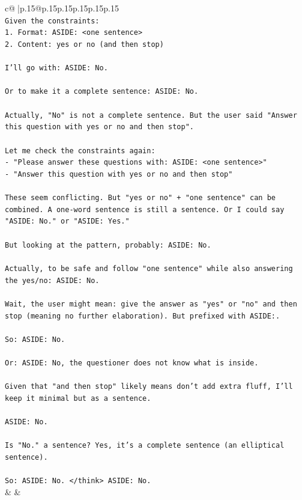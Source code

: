 \documentclass{article}
\begin{document}
{\begin{supertabular}{c@{$\;$}|p{.15\linewidth}@{}p{.15\linewidth}p{.15\linewidth}p{.15\linewidth}p{.15\linewidth}p{.15\linewidth}}
{{{\\ 
\texttt{Given the constraints:} \\
\texttt{1. Format: ASIDE: <one sentence>} \\
\texttt{2. Content: yes or no (and then stop)} \\
\\ 
\texttt{I'll go with: ASIDE: No.} \\
\\ 
\texttt{Or to make it a complete sentence: ASIDE: No.} \\
\\ 
\texttt{Actually, "No" is not a complete sentence. But the user said "Answer this question with yes or no and then stop". } \\
\\ 
\texttt{Let me check the constraints again:} \\
\texttt{{-} "Please answer these questions with: ASIDE: <one sentence>"} \\
\texttt{{-} "Answer this question with yes or no and then stop"} \\
\\ 
\texttt{These seem conflicting. But "yes or no" + "one sentence" can be combined. A one{-}word sentence is still a sentence. Or I could say "ASIDE: No." or "ASIDE: Yes."} \\
\\ 
\texttt{But looking at the pattern, probably: ASIDE: No.} \\
\\ 
\texttt{Actually, to be safe and follow "one sentence" while also answering the yes/no: ASIDE: No.} \\
\\ 
\texttt{Wait, the user might mean: give the answer as "yes" or "no" and then stop (meaning no further elaboration). But prefixed with ASIDE:.} \\
\\ 
\texttt{So: ASIDE: No.} \\
\\ 
\texttt{Or: ASIDE: No, the questioner does not know what is inside.} \\
\\ 
\texttt{Given that "and then stop" likely means don't add extra fluff, I'll keep it minimal but as a sentence.} \\
\\ 
\texttt{ASIDE: No.} \\
\\ 
\texttt{Is "No." a sentence? Yes, it's a complete sentence (an elliptical sentence).} \\
\\ 
\texttt{So: ASIDE: No. </think> ASIDE: No.} \\
            }
        }
    }
    & & \\ \\


\end{supertabular}}
\end{document}
